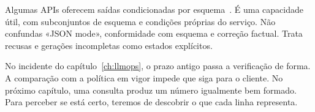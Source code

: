Algumas APIs oferecem saídas condicionadas por esquema~\citep{structured2026}. É uma capacidade útil, com subconjuntos de esquema e condições próprias do serviço. Não confundas «JSON mode», conformidade com esquema e correção factual. Trata recusas e gerações incompletas como estados explícitos.

No incidente do capítulo~\ref{ch:llmops}, o prazo antigo passa a verificação de forma. A comparação com a política em vigor impede que siga para o cliente. No próximo capítulo, uma consulta produz um número igualmente bem formado. Para perceber se está certo, teremos de descobrir o que cada linha representa.
